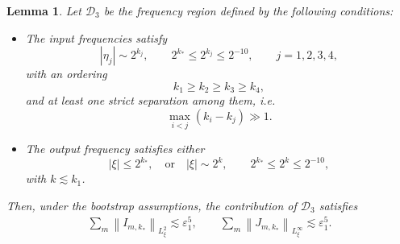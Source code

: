 \documentclass[reqno,english,11pt]{amsart}
\newcommand{\eps}{\varepsilon}
\newcommand{\snorm}[1]{\left\|#1\right\|}
\newtheorem{lemma}[theorem]{Lemma}
\theoremstyle{definition}
\numberwithin{equation}{section}
\begin{document}
\begin{lemma}\label{prop:deg_case_3}
Let $\mathcal{D}_3$ be the frequency region defined by the following conditions:
\begin{itemize}
    \item The input frequencies satisfy
    $$ |\eta_j| \sim 2^{k_j}, \qquad 2^{k_*} \le 2^{k_j} \le 2^{-10}, \qquad j=1,2,3,4,$$
    with an ordering
    $$  k_1 \ge k_2 \ge k_3 \ge k_4,$$
    and at least one strict separation among them, i.e.
    $$\max_{i<j}(k_i-k_j) \gg 1. $$
    \item The output frequency satisfies either
    $$  |\xi| \le 2^{k_*},  \quad \text{or} \quad |\xi| \sim 2^{k}, \qquad 2^{k_*} \le 2^{k} \le 2^{-10}, $$
    with $k \lesssim k_1$.
\end{itemize}
Then, under the bootstrap assumptions, the contribution of $\mathcal{D}_3$ satisfies
    \begin{align*}
        \sum_m\snorm{I_{m,k_*}}_{L^2_\xi}\lesssim \eps_1^5,\qquad
        \sum_m\snorm{J_{m,k_*}}_{L^\infty_\xi}\lesssim \eps_1^5.
    \end{align*}
    
\end{lemma}
\end{document}

